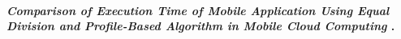 \paragraph{
    \textbf{\emph{Comparison of Execution Time of Mobile
    Application Using Equal Division
    and Profile-Based Algorithm in Mobile
    Cloud Computing}
    }
    \cite[pág. 59]{chaudhary_microservices_2020}.
}